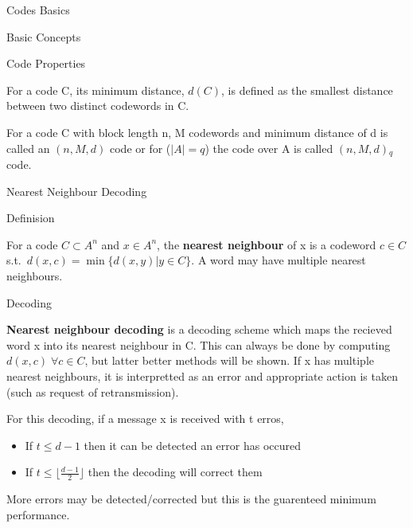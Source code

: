 \documentclass[12pt, letterpaper]{article}
\begin{document}
\begin{section}{Codes Basics}
\begin{subsection}{Basic Concepts}
    \begin{subsubsection}{Code Properties}

      For a code C, its minimum distance, \(d(C)\), is defined as the smallest
      distance between two distinct codewords in C.

      For a code C with block length n, M codewords and minimum distance of d
      is called an \((n, M, d)\) code or for (\( | A | = q\)) the code over A
      is called \((n, M, d){}_{q}\) code.

    \end{subsubsection}

  \end{subsection}

  \begin{subsection}{Nearest Neighbour Decoding}

    \begin{subsubsection}{Definision}

      For a code \(C \subset A^{n}\) and \(x \in A^{n}\), the \textbf{nearest
        neighbour} of x is a codeword \(c \in C\) s.t.\ \(d(x, c) = \min \{
      d(x, y) | y \in C \}\). A word may have multiple nearest neighbours.

    \end{subsubsection}

    \begin{subsubsection}{Decoding}

      \textbf{Nearest neighbour decoding} is a decoding scheme which maps the
      recieved word x into its nearest neighbour in C. This can always be done
      by computing \(d(x, c) \; \forall c \in C\), but latter better methods
      will be shown. If x has multiple nearest neighbours, it is interpretted
      as an error and appropriate action is taken (such as request of
      retransmission).

      For this decoding, if a message x is received with t erros,
      \begin{itemize}
        \item If \(t \leq d - 1\) then it can be detected an error has occured
        \item If \(t \leq \lfloor \frac{d - 1}{2} \rfloor\) then the decoding
              will correct them
      \end{itemize}
      More errors may be detected/corrected but this is the guarenteed minimum
      performance.

    \end{subsubsection}


\end{subsection}
\end{section}
\end{document}
